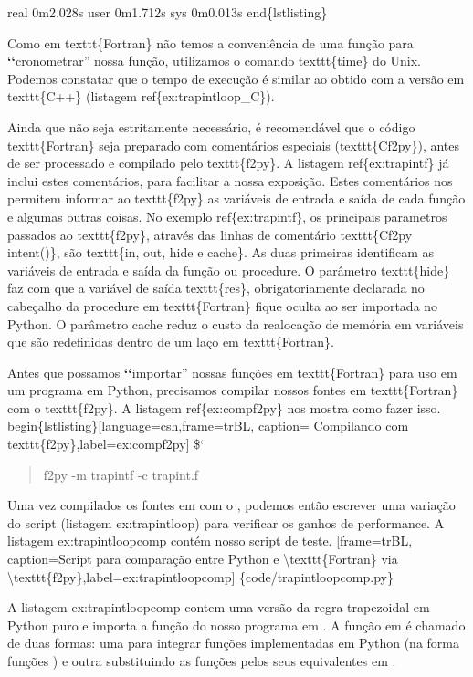 \documentclass[a4paper,10pt,portuguese]{sphinxmanual}
\begin{document}
real    0m2.028s
user    0m1.712s
sys     0m0.013s
end\{lstlisting\}

Como em texttt\{Fortran\} não temos a conveniência de uma função para {\color{red}\bfseries{}{}`{}`}cronometrar'' nossa função, utilizamos o comando texttt\{time\} do Unix. Podemos constatar que o tempo de execução é similar ao obtido com a versão em texttt\{C++\} (listagem ref\{ex:trapintloop\_C\}).

Ainda que não seja estritamente necessário, é recomendável que o código texttt\{Fortran\} seja preparado com comentários especiais (texttt\{Cf2py\}), antes de ser processado e compilado pelo texttt\{f2py\}. A listagem ref\{ex:trapintf\} já inclui estes comentários, para facilitar a nossa exposição. Estes comentários nos permitem informar ao texttt\{f2py\} as variáveis de entrada e saída de cada função e algumas outras coisas. No exemplo ref\{ex:trapintf\}, os principais parametros passados ao texttt\{f2py\}, através das linhas de comentário texttt\{Cf2py intent()\}, são texttt\{in, out, hide e cache\}. As duas primeiras identificam as variáveis de entrada e saída da função ou procedure. O parâmetro texttt\{hide\} faz com que a variável de saída texttt\{res\}, obrigatoriamente declarada no cabeçalho da procedure em texttt\{Fortran\} fique oculta ao ser importada no Python. O parâmetro cache reduz o custo da realocação de  memória em variáveis que são redefinidas dentro de um laço em texttt\{Fortran\}.

Antes que possamos {\color{red}\bfseries{}{}`{}`}importar'' nossas funções em texttt\{Fortran\} para uso em um programa em Python, precisamos compilar nossos fontes em texttt\{Fortran\} com o texttt\{f2py\}. A listagem ref\{ex:compf2py\} nos mostra como fazer isso.
begin\{lstlisting\}{[}language=csh,frame=trBL, caption= Compilando com texttt\{f2py\},label=ex:compf2py{]}
\${}`
\begin{quote}

f2py -m trapintf -c trapint.f
\end{quote}

Uma vez compilados os fontes em  com o , podemos
então escrever uma variação do script  (listagem
ex:trapintloop) para verificar os ganhos de performance. A listagem
ex:trapintloopcomp contém nosso script de teste.
{[}frame=trBL, caption=Script para comparação entre Python e \textbackslash{}texttt\{Fortran\} via \textbackslash{}texttt\{f2py\},label=ex:trapintloopcomp{]} \{code/trapintloopcomp.py\}

A listagem ex:trapintloopcomp contem uma versão da regra
trapezoidal em Python puro e importa a função  do nosso
programa em . A função em  é chamado de duas
formas: uma para integrar funções implementadas em Python (na forma
funções ) e outra substituindo as funções 
pelos seus equivalentes em .
\end{document}
